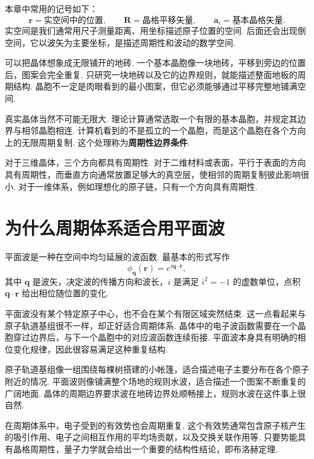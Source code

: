 \documentclass[UTF8,11pt,a4paper,openany]{ctexbook}
\newcommand{\term}[1]{\textbf{#1}}
\begin{document}
\begin{notationbox}
本章中常用的记号如下：
\[
\mathbf r=\text{实空间中的位置},\qquad
\mathbf R=\text{晶格平移矢量},\qquad
\mathbf a_i=\text{基本晶格矢量}.
\]
实空间是我们通常用尺子测量距离、用坐标描述原子位置的空间. 后面还会出现倒空间，它以波矢为主要坐标，是描述周期性和波动的数学空间. 
\end{notationbox}

\begin{analogybox}
可以把晶体想象成无限铺开的地砖. 一个基本晶胞像一块地砖，平移到旁边的位置后，图案会完全重复. 只研究一块地砖以及它的边界规则，就能描述整面地板的周期结构. 晶胞不一定是肉眼看到的最小图案，但它必须能够通过平移完整地铺满空间. 
\end{analogybox}

真实晶体当然不可能无限大. 理论计算通常选取一个有限的基本晶胞，并规定其边界与相邻晶胞相连. 计算机看到的不是孤立的一个晶胞，而是这个晶胞在各个方向上的无限周期复制. 这个处理称为\term{周期性边界条件}. 

对于三维晶体，三个方向都具有周期性. 对于二维材料或表面，平行于表面的方向具有周期性，而垂直方向通常放置足够大的真空层，使相邻的周期复制彼此影响很小. 对于一维体系，例如理想化的原子链，只有一个方向具有周期性. 

\section{为什么周期体系适合用平面波}

平面波是一种在空间中均匀延展的波函数. 最基本的形式写作
\[
\phi_{\mathbf q}(\mathbf r)=e^{i\mathbf q\cdot\mathbf r},
\]
其中 $\mathbf q$ 是波矢，决定波的传播方向和波长，$i$ 是满足 $i^2=-1$ 的虚数单位，点积 $\mathbf q\cdot\mathbf r$ 给出相位随位置的变化. 

平面波没有某个特定原子中心，也不会在某个有限区域突然结束. 这一点看起来与原子轨道基组很不一样，却正好适合周期体系. 晶体中的电子波函数需要在一个晶胞穿过边界后，与下一个晶胞中的对应波函数连续衔接. 平面波本身具有明确的相位变化规律，因此很容易满足这种重复结构. 

\begin{analogybox}
原子轨道基组像一组围绕每棵树搭建的小帐篷，适合描述电子主要分布在各个原子附近的情况. 平面波则像铺满整个场地的规则水波，适合描述一个图案不断重复的广阔地面. 晶体的周期边界要求波在地砖边界处顺畅接上，规则水波在这件事上很自然. 
\end{analogybox}

在周期体系中，电子受到的有效势也会周期重复. 这个有效势通常包含原子核产生的吸引作用、电子之间相互作用的平均场贡献，以及交换关联作用等. 只要势能具有晶格周期性，量子力学就会给出一个重要的结构性结论，即布洛赫定理. 
\end{document}
